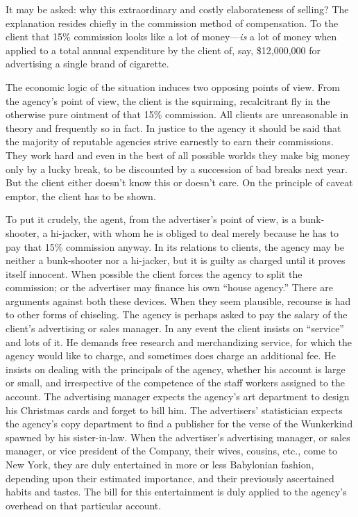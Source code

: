 \documentclass[openany,nobib]{tufte-book}
\begin{document}
It may be asked: why this extraordinary and costly elaborateness of
selling? The explanation resides chiefly in the commission method of
compensation. To the client that 15\% commission looks like a lot of
money---\emph{is} a lot of money when applied to a total annual
expenditure by the client of, say, \$12,000,000 for advertising a single
brand of cigarette.

The economic logic of the situation induces two opposing points of view.
From the agency's point of view, the client is the squirming,
recalcitrant fly in the otherwise pure ointment of that 15\% commission.
All clients are unreasonable in theory and frequently so in fact. In
justice to the agency it should be said that the majority of reputable
agencies strive earnestly to earn their commissions. They work hard and
even in the best of all possible worlds they make big money only by a
lucky break, to be discounted by a succession of bad breaks next year.
But the client either doesn't know this or doesn't care. On the
principle of caveat emptor, the client has to be shown.

To put it crudely, the agent, from the advertiser's point of view, is a
bunk-shooter, a hi-jacker, with whom he is obliged to deal merely
because he has to pay that 15\% commission anyway. In its relations to
clients, the agency may be neither a bunk-shooter nor a hi-jacker, but
it is guilty as charged until it proves itself innocent. When possible
the client forces the agency to split the commission; or the advertiser
may finance his own ``house agency.'' There are arguments against both
these devices. When they seem plausible, recourse is had to other forms
of chiseling. The agency is perhaps asked to pay the salary of the
client's advertising or sales manager. In any event the client insists
on ``service'' and lots of it. He demands free research and
merchandizing service, for which the agency would like to charge, and
sometimes does charge an additional fee. He insists on dealing with the
principals of the agency, whether his account is large or small, and
irrespective of the competence of the staff workers assigned to the
account. The advertising manager expects the agency's art department to
design his Christmas cards and forget to bill him. The advertisers'
statistician expects the agency's copy department to find a publisher
for the verse of the Wunkerkind spawned by his sister-in-law. When the
advertiser's advertising manager, or sales manager, or vice president of
the Company, their wives, cousins, etc., come to New York, they are duly
entertained in more or less Babylonian fashion, depending upon their
estimated importance, and their previously ascertained habits and
tastes. The bill for this entertainment is duly applied to the agency's
overhead on that particular account.
\end{document}

